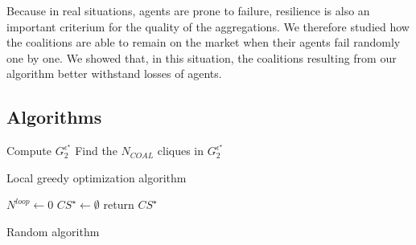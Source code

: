 \documentclass[conference]{IEEEtran}
\begin{document}
Because in real situations, agents are prone to failure, resilience is also an important criterium for the quality of the aggregations. We therefore studied how the coalitions are able to remain on the market when their agents fail randomly one by one. We showed that, in this situation, the coalitions resulting from our algorithm better withstand losses of agents.

%
%

  




\appendix
\subsection{Algorithms}


\begin{algorithm}
 Compute $ G_{2}^{\epsilon^{\star}} $ \;
 Find the $ N_{COAL} $ cliques in $ G_{2}^{\epsilon^{\star}} $\;
 \caption{Local greedy optimization algorithm}
 \label{alg:algo1}
\end{algorithm}



\begin{algorithm}
 $ N^{loop} \leftarrow 0 $ \;
 $ CS^{\star} \leftarrow \emptyset $\;
  return $ CS^{\star} $
 \caption{Random algorithm}
 \label{alg:algo2}
\end{algorithm}
\end{document}
